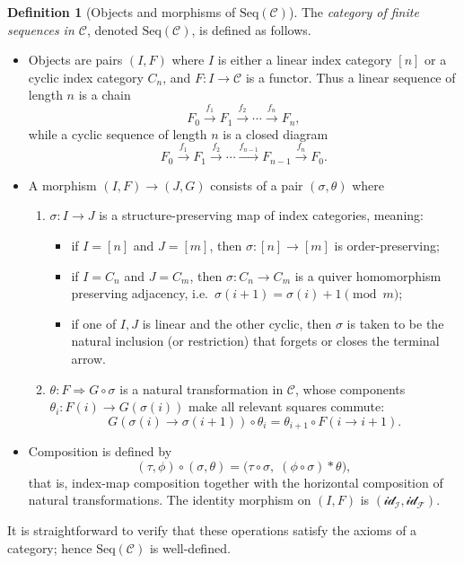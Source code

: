 \documentclass[11pt]{book}
\theoremstyle{definition}
\newtheorem{definition}{Definition}[section]
\theoremstyle{plain}
\theoremstyle{remark}
\begin{document}
\begin{definition}[Objects and morphisms of $\mathrm{Seq}(\mathcal C)$]
The \emph{category of finite sequences in $\mathcal{C}$}, denoted $\mathrm{Seq}(\mathcal C)$,
is defined as follows.
\begin{itemize}
\item Objects are pairs $(I,F)$ where $I$ is either a linear index category $[n]$
or a cyclic index category $C_n$, and $F:I\to\mathcal C$ is a functor.
Thus a linear sequence of length $n$ is a chain
\[
F_0\xrightarrow{f_1}F_1\xrightarrow{f_2}\cdots\xrightarrow{f_n}F_n,
\]
while a cyclic sequence of length $n$ is a closed diagram
\[
F_0\xrightarrow{f_1}F_1\xrightarrow{f_2}\cdots
\xrightarrow{f_{n-1}}F_{n-1}\xrightarrow{f_n}F_0.
\]

\item A morphism $(I,F)\to(J,G)$ consists of
a pair $(\sigma,\theta)$ where
\begin{enumerate}
\item $\sigma:I\to J$ is a structure-preserving map of index categories,
meaning:
\begin{itemize}
  \item if $I=[n]$ and $J=[m]$, then $\sigma:[n]\to[m]$ is order-preserving;
  \item if $I=C_n$ and $J=C_m$, then $\sigma:C_n\to C_m$ is a quiver homomorphism
        preserving adjacency, i.e.\ $\sigma(i{+}1)=\sigma(i){+}1\pmod m$;
  \item if one of $I,J$ is linear and the other cyclic,
        then $\sigma$ is taken to be the natural inclusion (or restriction)
        that forgets or closes the terminal arrow.
\end{itemize}
\item $\theta:F\Rightarrow G\circ\sigma$ is a natural transformation in $\mathcal C$,
whose components $\theta_i:F(i)\to G(\sigma(i))$
make all relevant squares commute:
\[
G(\sigma(i)\to\sigma(i{+}1))\circ\theta_i
=\theta_{i{+}1}\circ F(i\to i{+}1).
\]
\end{enumerate}
\item Composition is defined by
\[
(\tau,\phi)\circ(\sigma,\theta)
=\bigl(\tau\!\circ\!\sigma,\;(\phi\!\circ\!\sigma)\ast\theta\bigr),
\]
that is, index-map composition together with the horizontal composition
of natural transformations.
The identity morphism on $(I,F)$ is $(\mathcal{id_I},\mathcal{id_F})$.
\end{itemize}
It is straightforward to verify that these operations satisfy the axioms of a category;
hence $\mathrm{Seq}(\mathcal C)$ is well-defined.
\end{definition}
\end{document}
